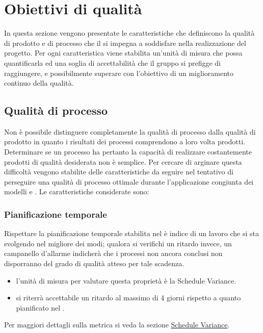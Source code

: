 \documentclass[a4paper, titlepage]{article}
\begin{document}
\newpage
\section{Obiettivi di qualità}
In questa sezione vengono presentate le caratteristiche che definiscono la qualità di prodotto e di processo che il  si impegna a soddisfare nella realizzazione del progetto. 
\newline Per ogni caratteristica viene stabilita un'unità di misura che possa quantificarla ed una soglia di accettabilità che il gruppo si prefigge di raggiungere, e possibilmente superare con l'obiettivo di un miglioramento continuo della qualità.

\subsection{Qualità di processo}
Non è possibile distinguere completamente la qualità di processo dalla qualità di prodotto in quanto i risultati dei processi comprendono a loro volta prodotti. Determinare se un processo ha pertanto la capacità di realizzare costantemente prodotti di qualità desiderata non è semplice. 
\newline Per cercare di arginare questa difficoltà vengono stabilite delle caratteristiche da seguire nel tentativo di perseguire una qualità di processo ottimale durante l'applicazione congiunta dei modelli  e .
\newline Le caratteristiche considerate sono:

\subsubsection{Pianificazione temporale}
Rispettare la pianificazione temporale stabilita nel  è indice di un lavoro che si sta svolgendo nel migliore dei modi; qualora si verifichi un ritardo invece, un campanello d'allarme indicherà che i processi non ancora conclusi non disporranno del grado di qualità atteso per tale scadenza.
\begin{itemize}
\item {} l'unità di misura per valutare questa proprietà è la Schedule Variance.
\item {} si riterrà accettabile un ritardo al massimo di 4 giorni rispetto a quanto pianificato nel .
\end{itemize}
Per maggiori dettagli sulla metrica si veda la sezione \hyperref[par:SV]{Schedule Variance}.
\end{document}
